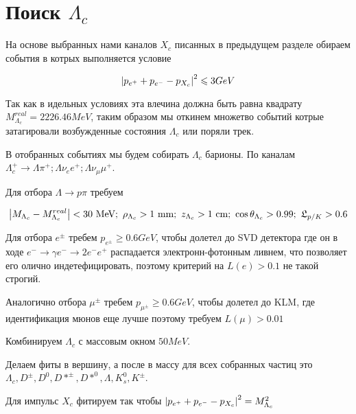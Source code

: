 \section{Поиск $\Lambda_c$}

На основе выбранных нами каналов $X_c$ писанных в предыдущем разделе 
обираем события в котрых выполняется условие 

\begin{equation}
    \abs{p_{e^+} + p_{e^-} - p_{X_c}}^2 \leqslant 3 GeV
\end{equation}

Так как в идельных условиях эта влечина должна быть равна квадрату $M^{real}_{\Lambda_c} = 2226.46 MeV$, 
таким образом мы откинем множетво событий котрые затагировали 
возбужденные состояния $\Lambda_c$ или поряли трек.

В отобранных событиях мы будем собирать $\Lambda_c$ барионы. 
По каналам $\Lambda_c^+ \to \Lambda \pi^+; \Lambda \nu_e e^+; \Lambda \nu_\mu \mu^+$.

\newdot Для отбора $\Lambda \to p \pi$ требуем 

$$
\abs{ M_{\Lambda_c} - M^{real}_{\Lambda_c} } < 30 \text{ MeV}; 
\ \rho_{\Lambda_c} > 1 \text{ mm}; \ z_{\Lambda_c} > 1 \text{ cm}; 
\ \cos \theta_{\Lambda_c} > 0.99;
\ \mathfrak{L}_{p/K } > 0.6 
$$

\newdot Для отбора $e^\pm$ требем $p_{e^\pm} \geq 0.6 GeV$, чтобы долетел до SVD 
детектора где он в ходе $e^- \to \gamma e^- \to 2e^- e^+$ распадается электронн-фотонным ливнем, 
что позволяет его олично индетефицировать, поэтому критерий на $L(e) > 0.1$ не такой строгий.

\newdot Аналогично отбора $\mu^\pm$ требем $p_{\mu^\pm} \geq 0.6 GeV$, чтобы долетел до KLM, 
где идентификация мюнов еще лучше поэтому требуем $L(\mu) > 0.01$ 

\newdot Комбинируем $\Lambda_c$ с массовым окном $50 MeV$.

\newdot Делаем фиты в вершину, а после в массу для всех собранных частиц это 
$\Lambda_c, D^{\pm}, D^0, D*^{\pm}, D*^0, \Lambda, K_s^0, K^{\pm}$.

\newdot Для импульс $X_c$ фитируем так чтобы $\abs{p_{e^+} + p_{e^-} - p_{X_c}}^2 = M^2_{\Lambda_c}$

 







